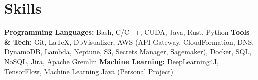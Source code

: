 ﻿
\section{Skills}

\textbf{Programming Languages: } Bash, C/C++, CUDA, Java, Rust, Python
\bigbreak
\textbf{Tools \& Tech: } Git, \LaTeX, DbVisualizer, AWS (API Gateway, CloudFormation, DNS, DynamoDB, Lambda, Neptune, S3, Secrets Manager, Sagemaker), Docker, SQL, NoSQL, Jira, Apache Gremlin
\bigbreak
\textbf{Machine Learning: } DeepLearning4J, TensorFlow, Machine Learning Java (Personal Project)